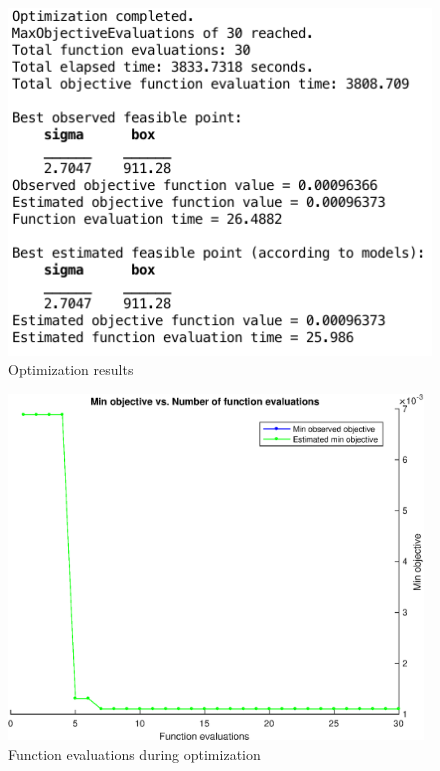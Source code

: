 \begin{figure}
\begin{center}
\includegraphics[width=15cm]{figures/optimizationResultsStuckFault}    %
\caption{Optimization results} 
\label{fig:optimizationResultsStuckFault}
\end{center}
\end{figure}

\begin{figure}
\begin{center}
\includegraphics[width=11cm]{figures/funcEval2}    %
\caption{Function evaluations during optimization} 
\label{fig:funcEval1}
\end{center}
\end{figure}

